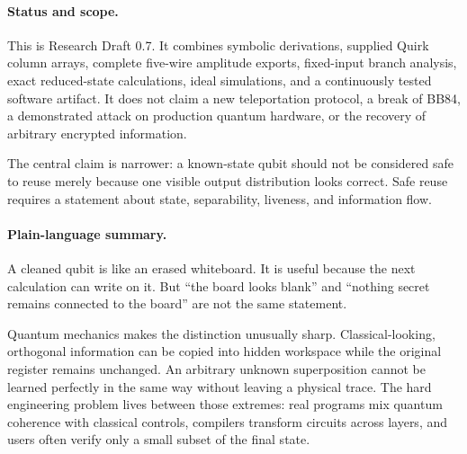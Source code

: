 \paragraph{Status and scope.}
This is Research Draft 0.7. It combines symbolic derivations, supplied Quirk
column arrays, complete five-wire amplitude exports, fixed-input branch analysis, exact reduced-state
calculations, ideal simulations, and a continuously tested software artifact. It does not claim a new teleportation
protocol, a break of BB84, a demonstrated attack on production quantum hardware,
or the recovery of arbitrary encrypted information.

The central claim is narrower: a known-state qubit should not be considered safe
to reuse merely because one visible output distribution looks correct. Safe
reuse requires a statement about state, separability, liveness, and information
flow.

\paragraph{Plain-language summary.}
A cleaned qubit is like an erased whiteboard. It is useful because the next
calculation can write on it. But ``the board looks blank'' and ``nothing secret
remains connected to the board'' are not the same statement.

Quantum mechanics makes the distinction unusually sharp. Classical-looking,
orthogonal information can be copied into hidden workspace while the original
register remains unchanged. An arbitrary unknown superposition cannot be
learned perfectly in the same way without leaving a physical trace. The hard
engineering problem lives between those extremes: real programs mix quantum
coherence with classical controls, compilers transform circuits across layers,
and users often verify only a small subset of the final state.
